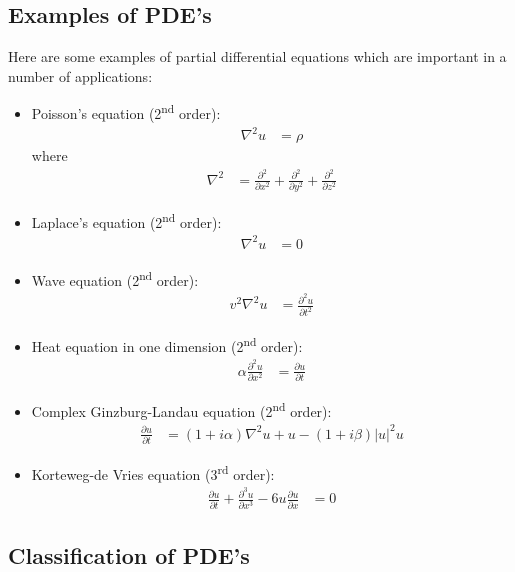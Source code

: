 \documentclass[twocolumn]{myarticle}
\begin{document}
\subsection{Examples of PDE's}
\label{subsec:examples_of_pdes}

Here are some examples of partial differential equations which are important in a number of applications:
\begin{itemize}
\item
    Poisson's equation (2\textsuperscript{nd} order):
    \begin{align}
        \nabla^2 u &= \rho
    \end{align}
    where
    \begin{align}
        \nabla^2 &= \frac{\partial^2}{\partial x^2} + \frac{\partial^2}{\partial y^2} + \frac{\partial^2}{\partial z^2}
    \end{align}
    
\item
    Laplace's equation (2\textsuperscript{nd} order):
    \begin{align}
        \nabla^2 u &= 0
    \end{align}
\item
    Wave equation (2\textsuperscript{nd} order):
    \begin{align}
        v^2 \nabla^2 u &= \frac{\partial^2 u}{\partial t^2}
    \end{align}
\item
    Heat equation in one dimension (2\textsuperscript{nd} order):
    \begin{align}
        \alpha \frac{\partial^2 u}{\partial x^2} &= \frac{\partial u}{\partial t}
    \end{align}
\item
    Complex Ginzburg-Landau equation (2\textsuperscript{nd} order):
    \begin{align}
        \frac{\partial u}{\partial t} &= (1 + i \alpha) \nabla^2 u + u - (1 + i \beta) |u|^2 u 
    \end{align}
\item
    Korteweg-de Vries equation (3\textsuperscript{rd} order):
    \begin{align}
        \frac{\partial u}{\partial t} + \frac{\partial^3 u}{\partial x^3} - 6 u \frac{\partial u}{\partial x} &= 0
    \end{align}
\end{itemize}

\subsection{Classification of PDE's}
\label{subsec:classification_of_pde_s}
\end{document}
